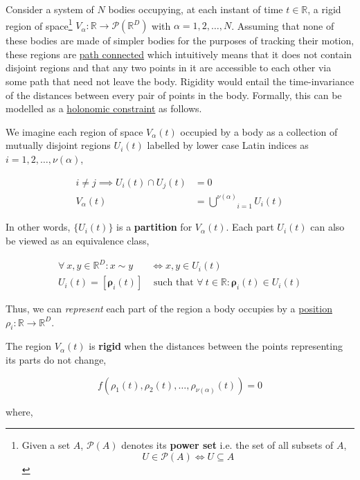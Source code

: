 \documentclass[oneside]{book}
\begin{document}
Consider a system of $N$ bodies occupying, at each instant of time $t \in \mathbb{R}$, a rigid region of space\footnote{Given a set $A$, $\mathcal{P}(A)$ denotes its \textbf{power set} i.e. the set of all subsets of $A$, \\
$$U \in \mathcal{P}(A) \Longleftrightarrow U \subseteq A$$} $V_{\alpha} : \mathbb{R} \to \mathcal{P}(\mathbb{R}^{D})$ with $\alpha = 1, 2, \dots, N$. Assuming that none of these bodies are made of simpler bodies for the purposes of tracking their motion, these regions are \hyperref[path_connectedness_defn]{path connected} which intuitively means that it does not contain disjoint regions and that any two points in it are accessible to each other via some path that need not leave the body. Rigidity would entail the time-invariance of the distances between every pair of points in the body. Formally, this can be modelled as a \hyperref[holonomic_constraint_defn]{holonomic constraint} as follows. 

We imagine each region of space $V_{\alpha}(t)$ occupied by a body as a collection of mutually disjoint regions $U_{i}(t)$ labelled by lower case Latin indices as $i = 1, 2, \dots, \nu(\alpha)$,

\begin{align*}
i \neq j \implies U_i(t) \cap U_j(t) & = 0 \\
V_{\alpha}(t) & = \underset{i=1}{\overset{\nu(\alpha)}{\bigcup}} U_i(t)
\end{align*}

In other words, $\{ U_i(t) \}$ is a \textbf{partition} for $V_{\alpha}(t)$. Each part $U_i(t)$ can also be viewed as an equivalence class,

\begin{align*}
\forall \: x, y \in \mathbb{R}^D : x \sim y & \Longleftrightarrow x, y \in U_i(t) \\
U_i(t) = [\pmb{\rho}_i(t)] & \text{ such that } \forall \: t \in \mathbb{R} : \pmb{\rho}_i(t) \in U_i(t)
\end{align*}

Thus, we can \emph{represent} each part of the region a body occupies by a \hyperref[positions_defn]{position} $\rho_i : \mathbb{R} \to \mathbb{R}^D$.

The region $V_{\alpha}(t)$ is \textbf{rigid} when the distances between the points representing its parts do not change,

$$f(\rho_1(t), \rho_2(t), \dots, \rho_{\nu(\alpha)}(t)) = 0$$

where,
\end{document}
